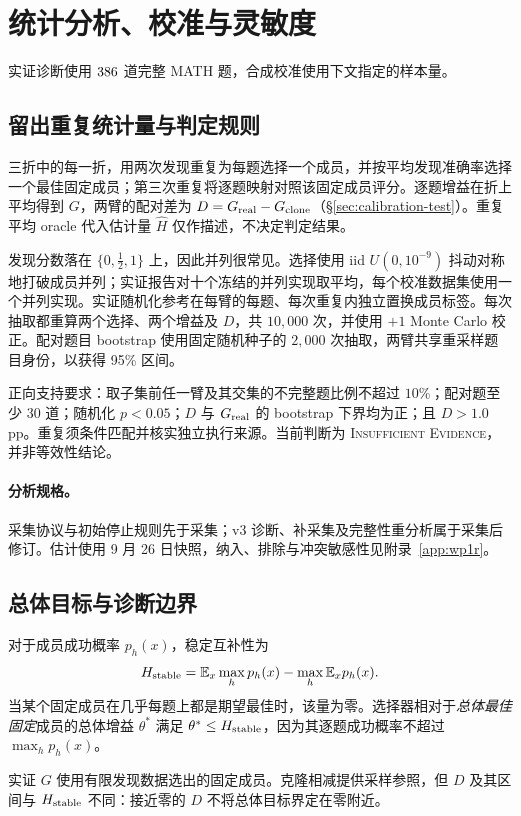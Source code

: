 \section{统计分析、校准与灵敏度}\label{app:statistics}\label{app:diagnostics}
实证诊断使用 $386$ 道完整 MATH 题，合成校准使用下文指定的样本量。

\subsection{留出重复统计量与判定规则}
三折中的每一折，用两次发现重复为每题选择一个成员，并按平均发现准确率选择一个最佳固定成员；第三次重复将逐题映射对照该固定成员评分。逐题增益在折上平均得到 $G$，两臂的配对差为 $D=G_{\rm real}-G_{\rm clone}$（\S\ref{sec:calibration-test}）。重复平均 oracle 代入估计量 $\widehat H$ 仅作描述，不决定判定结果。

发现分数落在 $\{0,\tfrac12,1\}$ 上，因此并列很常见。选择使用 iid $U(0,10^{-9})$ 抖动对称地打破成员并列；实证报告对十个冻结的并列实现取平均，每个校准数据集使用一个并列实现。实证随机化参考在每臂的每题、每次重复内独立置换成员标签。每次抽取都重算两个选择、两个增益及 $D$，共 $10{,}000$ 次，并使用 $+1$ Monte Carlo 校正。配对题目 bootstrap 使用固定随机种子的 $2{,}000$ 次抽取，两臂共享重采样题目身份，以获得 95\% 区间。

正向支持要求：取子集前任一臂及其交集的不完整题比例不超过 $10\%$；配对题至少 $30$ 道；随机化 $p<0.05$；$D$ 与 $G_{\rm real}$ 的 bootstrap 下界均为正；且 $D>1.0$\,pp。重复须条件匹配并核实独立执行来源。当前判断为 \textsc{Insufficient Evidence}，并非等效性结论。

\paragraph{分析规格。}
采集协议与初始停止规则先于采集；v3 诊断、补采集及完整性重分析属于采集后修订。估计使用 9 月 26 日快照，纳入、排除与冲突敏感性见附录~\ref{app:wp1r}。

\subsection{总体目标与诊断边界}
对于成员成功概率 $p_h(x)$，稳定互补性为
\[
H_{\rm stable}=\mathbb E_x\max_h p_h(x)-\max_h\mathbb E_x p_h(x).
\]
当某个固定成员在几乎每题上都是期望最佳时，该量为零。选择器相对于\emph{总体最佳固定}成员的总体增益 $\theta^*$ 满足 $\theta^*\le H_{\rm stable}$，因为其逐题成功概率不超过 $\max_h p_h(x)$。

实证 $G$ 使用有限发现数据选出的固定成员。克隆相减提供采样参照，但 $D$ 及其区间与 $H_{\rm stable}$ 不同：接近零的 $D$ 不将总体目标界定在零附近。

